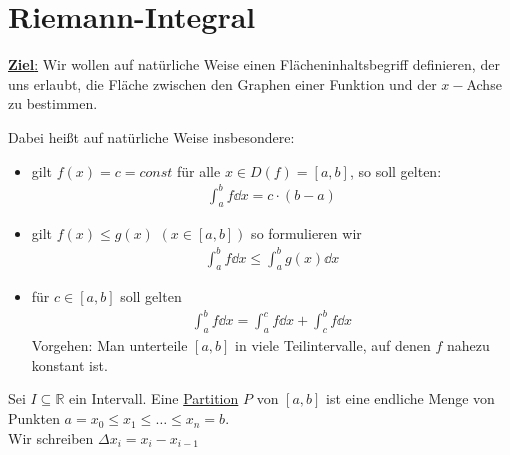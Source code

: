 \section{Riemann-Integral}\label{kap_riemann_integral}
\underline{\textbf{Ziel}:} Wir wollen auf \glqq{} natürliche\grqq{} Weise einen 
Flächeninhaltsbegriff definieren, der uns erlaubt, die Fläche zwischen den Graphen 
einer Funktion und der $x-$Achse zu bestimmen.
	
Dabei heißt auf \glqq natürliche Weise\grqq{} insbesondere: 
\begin{itemize}
	\item gilt $f(x) = c = const$ für alle $x \in D (f) = [a,b]$, so soll 
	gelten:
	\begin{align*}
		\int_a^b f \dd{x} = c \cdot ( b - a)
	\end{align*}
	\item gilt $f(x) \leq g(x)$ $(x \in [a,b])$ so formulieren wir
	\begin{align*}
		\int_a^b f \dd{x} \leq \int_a^b g(x) \dd{x} 
	\end{align*}
	\item für $c \in [a,b]$ soll gelten
	\begin{align*}
		\int_a^b f \dd{x} = \int_a^c f \dd{x} + \int_c^b f\dd{x}
	\end{align*}
	Vorgehen: Man unterteile $[a,b]$ in \glqq viele\grqq{} Teilintervalle, auf denen 
	$f$ nahezu konstant ist.
\end{itemize} 

\begin{Definition}{
	Sei $ I \subseteq \mathbb{R}$ ein Intervall. Eine \underline{Partition} $P$ von 
	$[a,b]$ ist eine endliche Menge von Punkten $a = x_0 \leq x_1 \leq \hdots
	\leq x_n = b$.\\
	Wir schreiben $\Delta x_i = x_i - x_{i-1}$
}\end{Definition}

